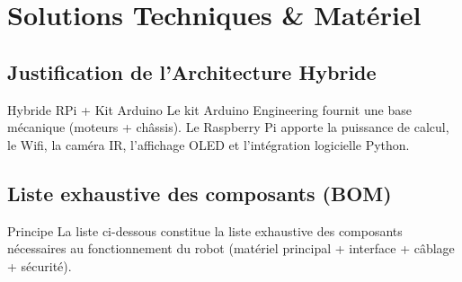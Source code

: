 \documentclass[a4paper,12pt]{report}
\begin{document}
\chapter{Solutions Techniques \& Matériel}

\section{Justification de l'Architecture Hybride}
\begin{justification}{Hybride RPi + Kit Arduino}
Le kit Arduino Engineering fournit une base mécanique (moteurs + châssis).  
Le Raspberry Pi apporte la puissance de calcul, le Wifi, la caméra IR, l’affichage OLED et l’intégration logicielle Python.
\end{justification}
\newpage
\section{Liste exhaustive des composants (BOM)}
\begin{infobox}{Principe}
La liste ci-dessous constitue la liste exhaustive des composants nécessaires au fonctionnement du robot (matériel principal + interface + câblage + sécurité).
\end{infobox}
\end{document}
